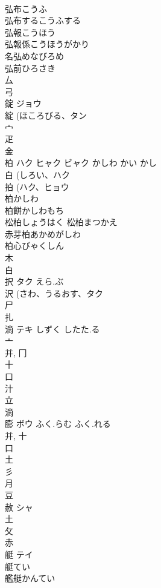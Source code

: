 \documentclass[8pt]{extreport}
\begin{document}
\begin{CJK}{UTF8}{min}
\\	弘布こうふ
\\	弘布するこうふする
\\	弘報こうほう
\\	弘報係こうほうがかり
\\	名弘めなびろめ
\\	弘前ひろさき
\\	厶 
\\	弓 
\\	錠	ジョウ		
\\	綻 (ほころびる、タン 
\\	宀 
\\	疋 
\\	金 
\\	柏	ハク ヒャク ビャク	かしわ かい かし	
\\	白 (しろい、ハク 
\\	拍 (ハク、ヒョウ 
\\	柏かしわ 
\\	柏餅かしわもち 
\\	松柏しょうはく 松柏まつかえ 
\\	赤芽柏あかめがしわ 
\\	柏心びゃくしん 
\\	木 
\\	白 
\\	択	タク	えら.ぶ	
\\	沢 (さわ、うるおす、タク 
\\	尸 
\\	扎	
\\	滴	テキ	しずく したた.る	
\\	亠 
\\	并, 冂 
\\	十 
\\	口 
\\	汁 
\\	立 
\\	滴 
\\	膨	ボウ	ふく.らむ ふく.れる	
\\	并, 十 
\\	口 
\\	土 
\\	彡 
\\	月 
\\	豆 
\\	赦	シャ		
\\	土 
\\	攵 
\\	赤 
\\	艇	テイ		
\\	艇てい 
\\	艦艇かんてい 

\end{CJK}
\end{document}
